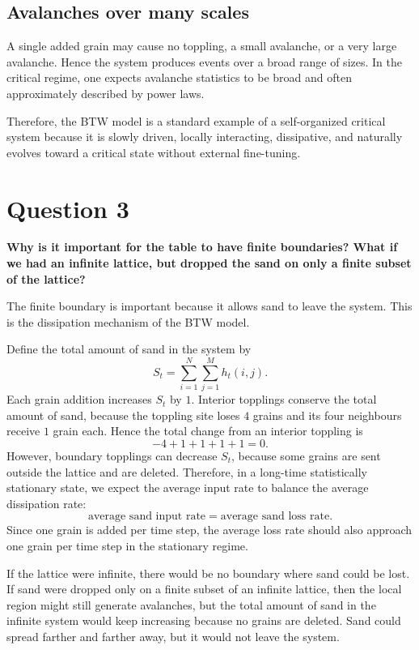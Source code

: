 \subsection*{Avalanches over many scales}

A single added grain may cause no toppling, a small avalanche, or a very large avalanche. Hence the system produces events over a broad range of sizes. In the critical regime, one expects avalanche statistics to be broad and often approximately described by power laws.

Therefore, the BTW model is a standard example of a self-organized critical system because it is slowly driven, locally interacting, dissipative, and naturally evolves toward a critical state without external fine-tuning.

\section*{Question 3}

\textbf{Why is it important for the table to have finite boundaries? What if we had an infinite lattice, but dropped the sand on only a finite subset of the lattice?}

The finite boundary is important because it allows sand to leave the system. This is the dissipation mechanism of the BTW model.

Define the total amount of sand in the system by
\[
    S_t=\sum_{i=1}^{N}\sum_{j=1}^{M} h_t(i,j).
\]
Each grain addition increases $S_t$ by $1$. Interior topplings conserve the total amount of sand, because the toppling site loses $4$ grains and its four neighbours receive $1$ grain each. Hence the total change from an interior toppling is
\[
    -4+1+1+1+1=0.
\]
However, boundary topplings can decrease $S_t$, because some grains are sent outside the lattice and are deleted. Therefore, in a long-time statistically stationary state, we expect the average input rate to balance the average dissipation rate:
\[
    \text{average sand input rate}
    =
    \text{average sand loss rate}.
\]
Since one grain is added per time step, the average loss rate should also approach one grain per time step in the stationary regime.

If the lattice were infinite, there would be no boundary where sand could be lost. If sand were dropped only on a finite subset of an infinite lattice, then the local region might still generate avalanches, but the total amount of sand in the infinite system would keep increasing because no grains are deleted. Sand could spread farther and farther away, but it would not leave the system.

